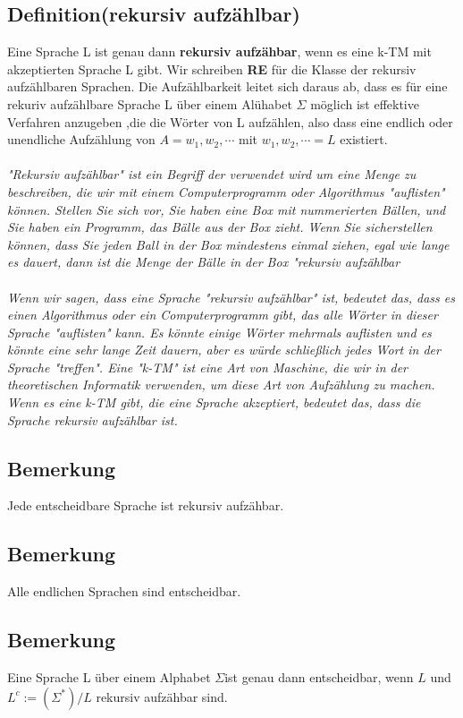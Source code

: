 \subsection{Definition(rekursiv aufzählbar)} Eine Sprache L ist genau dann \textbf{rekursiv aufzähbar}, wenn es eine k-TM mit akzeptierten Sprache L gibt. Wir schreiben \textbf{RE} für die Klasse der rekursiv aufzählbaren Sprachen. Die Aufzählbarkeit leitet sich daraus ab, dass es für eine rekuriv aufzählbare Sprache L über einem Alühabet $\Sigma$ möglich ist effektive Verfahren anzugeben ,die die Wörter von L aufzählen, also dass eine endlich oder unendliche Aufzählung von $A = w_1, w_2, \cdots$ mit ${w_1, w_2, \cdots} = L$ existiert.\\\\
\textit{"Rekursiv aufzählbar" ist ein Begriff der verwendet wird um eine Menge zu beschreiben, die wir mit einem Computerprogramm oder Algorithmus "auflisten" können.
Stellen Sie sich vor, Sie haben eine Box mit nummerierten Bällen, und Sie haben ein Programm, das Bälle aus der Box zieht. Wenn Sie sicherstellen können, dass Sie jeden Ball in der Box mindestens einmal ziehen, egal wie lange es dauert, dann ist die Menge der Bälle in der Box "rekursiv aufzählbar }\\\\
\textit{Wenn wir sagen, dass eine Sprache "rekursiv aufzählbar" ist, bedeutet das, dass es einen Algorithmus oder ein Computerprogramm gibt, das alle Wörter in dieser Sprache "auflisten" kann. Es könnte einige Wörter mehrmals auflisten und es könnte eine sehr lange Zeit dauern, aber es würde schließlich jedes Wort in der Sprache "treffen".
Eine "k-TM" ist eine Art von Maschine, die wir in der theoretischen Informatik verwenden, um diese Art von Aufzählung zu machen. Wenn es eine k-TM gibt, die eine Sprache akzeptiert, bedeutet das, dass die Sprache rekursiv aufzählbar ist.}
\subsection{Bemerkung} Jede entscheidbare Sprache ist rekursiv aufzähbar.

\subsection{Bemerkung} Alle endlichen Sprachen sind entscheidbar.

\subsection{Bemerkung} Eine Sprache L über einem Alphabet $\Sigma$ist genau dann entscheidbar, wenn $L$ und $L^c :=(\Sigma^*)/L$ rekursiv aufzähbar sind.

